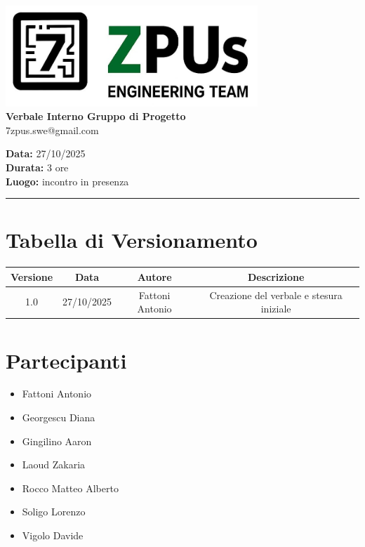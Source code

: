 \documentclass[a4paper,12pt]{article}
\begin{document}
\begin{center}
    \includegraphics[width=9.5cm]{../../../assets/logo7zpus.jpg}\\
    \Large \textbf{Verbale Interno Gruppo di Progetto}\\
    \vspace{0.5cm}
    \small\hspace{10cm} 7zpus.swe@gmail.com
\end{center}

\noindent
\textbf{Data:} 27/10/2025 \\
\textbf{Durata:}  3 ore\\
\textbf{Luogo:} incontro in presenza

\vspace{0.3cm}
\hrule
\vspace{0.5cm}

\tableofcontents

\newpage

\section{Tabella di Versionamento}
    \begin{tabular}{|c|c|c|c|}
        \hline
        \textbf{Versione} & \textbf{Data} & \textbf{Autore} & \textbf{Descrizione} \\
        \hline
        1.0 & 27/10/2025 & Fattoni Antonio & Creazione del verbale e stesura iniziale \\
        \hline
    \end{tabular}

\section{Partecipanti}
\begin{itemize}[noitemsep]
    \item Fattoni Antonio 
    \item Georgescu Diana
    \item Gingilino Aaron
    \item Laoud Zakaria
    \item Rocco Matteo Alberto
    \item Soligo Lorenzo
    \item Vigolo Davide
\end{itemize}
\end{document}
